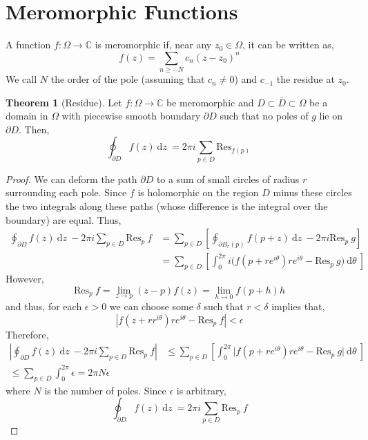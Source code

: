 \documentclass[12pt]{extarticle}
\newcommand{\C}{\mathbb{C}}
\renewcommand{\d}[1]{\: \mathrm{d}#1 \:}
\theoremstyle{definition}
\newtheorem{theorem}{Theorem}[section]
\newenvironment{definition}[1][Definition:]{\begin{trivlist}
\item[\hskip \labelsep {\bfseries #1}]}{\end{trivlist}}
\newcommand{\Res}[2]{\mathrm{Res}_{#1} \: #2}
\begin{document}
\section{Meromorphic Functions}

\begin{definition}
A function $f : \Omega \to \C$ is meromorphic if, near any $z_0 \in \Omega$, it can be written as,
\[ f(z) = \sum_{n \ge - N} c_n (z - z_0)^n \] 
We call $N$ the order of the pole (assuming that $c_n \neq 0$) and $c_{-1}$ the residue at $z_0$. 
\end{definition}


\begin{theorem}[Residue]
Let $f : \Omega \to \C$ be meromorphic and $D \subset \overline{D} \subset \Omega$ be a domain in $\Omega$ with piecewise smooth boundary $\partial D$ such that no poles of $g$ lie on $\partial D$. Then,
\[ \oint_{\partial D} f(z) \d{z} = 2 \pi i  \sum_{p \in D} \Res{f(p)} \]
\end{theorem}

\begin{proof}
We can deform the path $\partial D$ to a sum of small circles of radius $r$ surrounding each pole. Since $f$ is holomorphic on the region $D$ minus these circles the two integrals along these paths (whose difference is the integral over the boundary) are equal. Thus,
\begin{align*}
\oint_{\partial D} f(z) \d{z} - 2 \pi i \sum_{p \in D} \Res{p}{f} & = \sum_{p \in D} \left[ \oint_{\partial B_r(p)}  f(p + z) \d{z}  - 2 \pi i \Res{p}{g}   \right]
\\
& = \sum_{p \in D} \left[ \int_0^{2\pi} i \bigg( f(p + r e^{i\theta}) r e^{i \theta}  - \Res{p}{g} \bigg) \d{\theta}   \right]
\end{align*}
However,
\[ \Res{p}{f} = \lim_{z \to p} (z - p) f(z) = \lim_{h \to 0} f(p + h) h \]
and thus, for each $\epsilon > 0$ we can choose some $\delta$ such that $r < \delta$ implies that,
\[ \left| f(z + r r^{i \theta}) r e^{i \theta} - \Res{p}{f} \right| < \epsilon \]
Therefore,
\begin{align*}
\left| \oint_{\partial D} f(z) \d{z} - 2 \pi i \sum_{p \in D} \Res{p}{f} \right| & \le \sum_{p \in D} \left[ \int_0^{2\pi} \Big| f(p + r e^{i\theta}) r e^{i \theta}  - \Res{p}{g} \Big| \d{\theta}   \right]
\\
\le \sum_{p \in D} \int_0^{2 \pi} \epsilon = 2 \pi N \epsilon 
\end{align*}
where $N$ is the number of poles. Since $\epsilon$ is arbitrary,
\[ \oint_{\partial D} f(z) \d{z} = 2 \pi i \sum_{p \in D} \Res{p}{f} \]
\end{proof}
\end{document}
